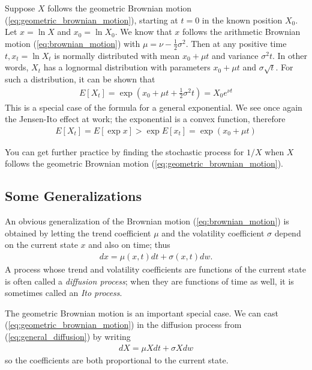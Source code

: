 \documentclass[\topdir/lecture\_notes.tex]{subfiles}
\begin{document}
Suppose \(X\) follows the geometric Brownian motion (\ref{eq:geometric_brownian_motion}), starting at \(t=0\) in the known position \(X_{0}\). Let \(x=\ln X\) and \(x_{0}=\ln X_{0}\). We know that \(x\) follows the arithmetic Brownian motion (\ref{eq:brownian_motion}) with \(\mu=\nu-\frac{1}{2} \sigma^{2}\). Then at any positive time \(t, x_{t}=\ln X_{t}\) is normally
distributed with mean \(x_{0}+\mu t\) and variance \(\sigma^{2} t\). In other words, \(X_{t}\) has a lognormal distribution with parameters \(x_{0}+\mu t\) and \(\sigma \sqrt{t}\). For such a distribution, it can be shown that
\begin{align*}
E\left[X_{t}\right]=\exp \left(x_{0}+\mu t+\frac{1}{2} \sigma^{2} t\right)=X_{0} e^{\nu t}
\end{align*}
This is a special case of the formula for a general exponential. We see once again the Jensen-Ito effect at work; the exponential is a convex function, therefore
\begin{align*}
E\left[X_{t}\right]=E[\exp x]>\exp E\left[x_{t}\right]=\exp (x_{0}+\mu t)
\end{align*}

You can get further practice by finding the stochastic process for \(1/X\) when \(X\) follows the geometric Brownian motion (\ref{eq:geometric_brownian_motion}).

\subsection{Some Generalizations}
An obvious generalization of the Brownian motion (\ref{eq:brownian_motion}) is obtained by letting the trend coefficient \(\mu\) and the volatility coefficient \(\sigma\) depend on the current state \(x\) and also on time; thus
\begin{align}
dx=\mu(x, t) dt+\sigma(x, t) dw. \label{eq:general_diffusion}
\end{align}
A process whose trend and volatility coefficients are functions of the current state is often called a \emph{diffusion process}; when they are functions of time as well, it is sometimes called an \emph{Ito process}.

The geometric Brownian motion is an important special case. We can cast (\ref{eq:geometric_brownian_motion}) in the diffusion process from (\ref{eq:general_diffusion}) by writing
\begin{align*}
dX=\mu X dt+\sigma X dw
\end{align*}
so the coefficients are both proportional to the current state.
\end{document}
